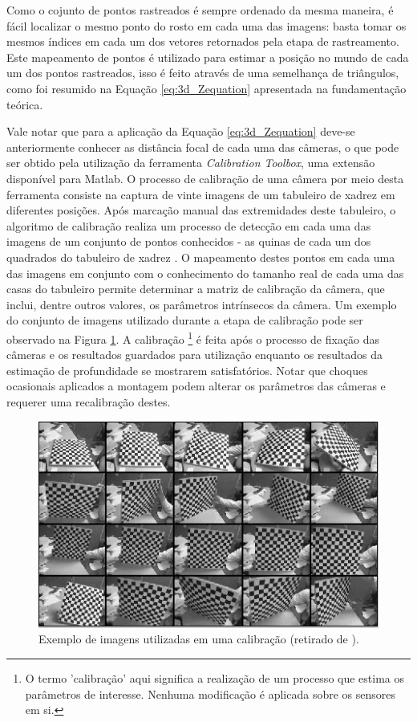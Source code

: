 Como o cojunto de pontos rastreados é sempre ordenado da mesma maneira, é fácil localizar o mesmo ponto do rosto em cada uma das imagens: basta tomar os mesmos índices em cada um dos vetores retornados pela etapa de rastreamento. Este mapeamento de pontos é utilizado para estimar a posição no mundo de cada um dos pontos rastreados, isso é feito através de uma semelhança de triângulos, como foi resumido na Equação \ref{eq:3d_Zequation} apresentada na fundamentação teórica.

Vale notar que para a aplicação da Equação \ref{eq:3d_Zequation} deve-se anteriormente conhecer as distância focal de cada uma das câmeras, o que pode ser obtido pela utilização da ferramenta \textit{Calibration Toolbox}, uma extensão disponível para Matlab. O processo de calibração de uma câmera por meio desta ferramenta consiste na captura de vinte imagens de um tabuleiro de xadrez em diferentes posições. Após marcação manual das extremidades deste tabuleiro, o algoritmo de calibração realiza um processo de detecção em cada uma das imagens de um conjunto de pontos conhecidos - as quinas de cada um dos quadrados do tabuleiro de xadrez . O mapeamento destes pontos em cada uma das imagens em conjunto com o conhecimento do tamanho real de cada uma das casas do tabuleiro permite determinar a matriz de calibração da câmera, que inclui, dentre outros valores, os parâmetros intrínsecos da câmera. Um exemplo do conjunto de imagens utilizado durante a etapa de calibração pode ser observado na Figura \ref{fig:calib_imagens}.
A calibração \footnote{O termo 'calibração' aqui significa a realização de um processo que estima os parâmetros de interesse. Nenhuma modificação é aplicada sobre os sensores em si.} é feita após o processo de fixação das câmeras e os resultados guardados para utilização enquanto os resultados da estimação de profundidade se mostrarem satisfatórios. Notar que choques ocasionais aplicados a montagem podem alterar os parâmetros das câmeras e requerer uma recalibração destes. 

\begin{figure}[h!]
\centering
\includegraphics[width=.6\linewidth]{figs/TG_calib_images.png}
\caption{Exemplo de imagens utilizadas em uma calibração (retirado de \cite{bouguetML}).}
\label{fig:calib_imagens}
\end{figure}

